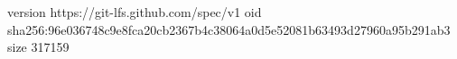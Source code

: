 version https://git-lfs.github.com/spec/v1
oid sha256:96e036748c9e8fca20cb2367b4c38064a0d5e52081b63493d27960a95b291ab3
size 317159
